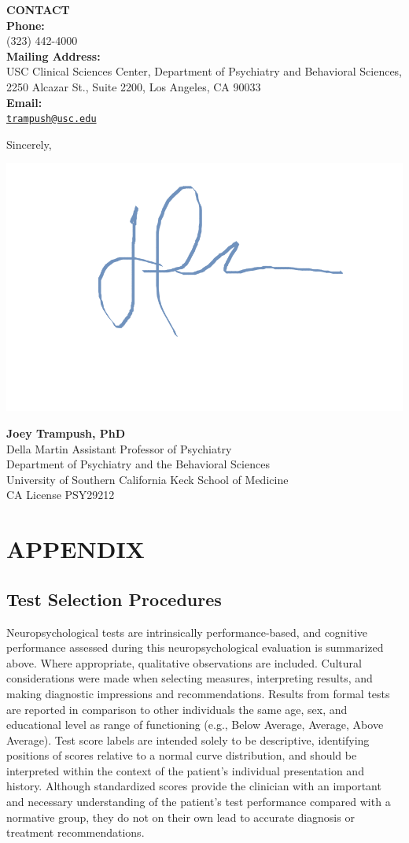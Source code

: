 \documentclass[%
numbers=noendperiod,
parskip=half,
bibliography=totoc,
DIV=calc,headsepline=true,
]{scrartcl}
\begin{document}
\begin{marginfigure}
\textbf{CONTACT}\\
\textbf{Phone:}\\
(323) 442-4000\\
\textbf{Mailing Address:}\\
USC Clinical Sciences Center, Department of Psychiatry and Behavioral
Sciences, 2250 Alcazar St., Suite 2200, Los Angeles, CA 90033\\
\textbf{Email:}\\
\href{mailto:trampush@usc.edu}{\nolinkurl{trampush@usc.edu}}\\
\end{marginfigure}

Sincerely,

\begin{flushleft}\includegraphics[width=0.35\linewidth]{jwtSig} \end{flushleft}

\textbf{Joey Trampush, PhD}\\
Della Martin Assistant Professor of Psychiatry\\
Department of Psychiatry and the Behavioral Sciences\\
University of Southern California Keck School of Medicine\\
CA License PSY29212 \newpage

\hypertarget{appendix}{%
\section{APPENDIX}\label{appendix}}

\hypertarget{test-selection-procedures}{%
\subsection{Test Selection Procedures}\label{test-selection-procedures}}

Neuropsychological tests are intrinsically performance-based, and cognitive
performance assessed during this neuropsychological evaluation is summarized
above. Where appropriate, qualitative observations are included. Cultural
considerations were made when selecting measures, interpreting results, and
making diagnostic impressions and recommendations. Results from formal tests are
reported in comparison to other individuals the same age, sex, and educational
level as range of functioning (e.g., Below Average, Average, Above Average).
Test score labels are intended solely to be descriptive, identifying positions
of scores relative to a normal curve distribution, and should be interpreted
within the context of the patient's individual presentation and history.
Although standardized scores provide the clinician with an important and
necessary understanding of the patient's test performance compared with a
normative group, they do not on their own lead to accurate diagnosis or
treatment recommendations.
\end{document}
